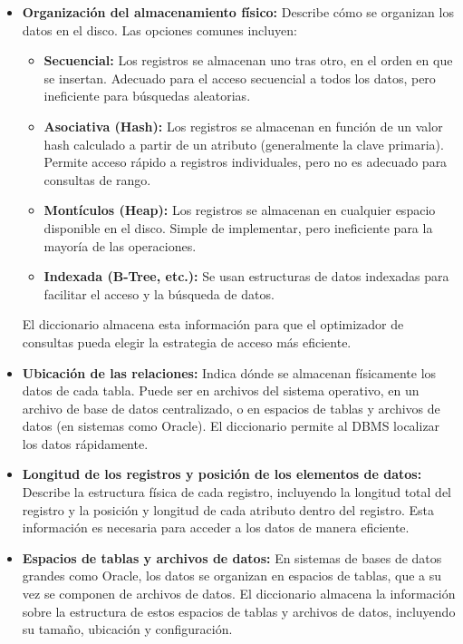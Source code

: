 \begin{itemize}
    \item \textbf{Organización del almacenamiento físico:} Describe cómo se organizan los datos en el disco.  Las opciones comunes incluyen:
    \begin{itemize}
        \item \textbf{Secuencial:}  Los registros se almacenan uno tras otro, en el orden en que se insertan.  Adecuado para el acceso secuencial a todos los datos, pero ineficiente para búsquedas aleatorias.
        \item \textbf{Asociativa (Hash):}  Los registros se almacenan en función de un valor hash calculado a partir de un atributo (generalmente la clave primaria).  Permite acceso rápido a registros individuales, pero no es adecuado para consultas de rango.
        \item \textbf{Montículos (Heap):}  Los registros se almacenan en cualquier espacio disponible en el disco.  Simple de implementar, pero ineficiente para la mayoría de las operaciones.
        \item \textbf{Indexada (B-Tree, etc.):} Se usan estructuras de datos indexadas para facilitar el acceso y la búsqueda de datos.
    \end{itemize}
    El diccionario almacena esta información para que el optimizador de consultas pueda elegir la estrategia de acceso más eficiente.

    \item \textbf{Ubicación de las relaciones:} Indica dónde se almacenan físicamente los datos de cada tabla.  Puede ser en archivos del sistema operativo, en un archivo de base de datos centralizado, o en espacios de tablas y archivos de datos (en sistemas como Oracle).  El diccionario permite al DBMS localizar los datos rápidamente.

    \item \textbf{Longitud de los registros y posición de los elementos de datos:}  Describe la estructura física de cada registro, incluyendo la longitud total del registro y la posición y longitud de cada atributo dentro del registro.  Esta información es necesaria para acceder a los datos de manera eficiente.

    \item \textbf{Espacios de tablas y archivos de datos:} En sistemas de bases de datos grandes como Oracle, los datos se organizan en espacios de tablas, que a su vez se componen de archivos de datos. El diccionario almacena la información sobre la estructura de estos espacios de tablas y archivos de datos, incluyendo su tamaño, ubicación y configuración.
\end{itemize}

